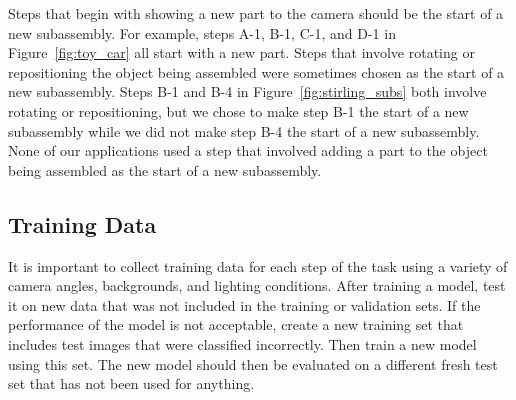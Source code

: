 Steps that begin with showing a new part to the camera should be the start of a
new subassembly. For example, steps A-1, B-1, C-1, and D-1 in
Figure~\ref{fig:toy_car} all start with a new part.
Steps that involve rotating or repositioning the object being assembled were
sometimes chosen as the start of a new subassembly.
Steps B-1 and B-4 in Figure~\ref{fig:stirling_subs} both involve rotating or
repositioning, but we chose to make step B-1 the start of a new subassembly
while we did not make step B-4 the start of a new subassembly.
None of our applications used a step that involved adding a part to the object
being assembled as the start of a new subassembly.

\subsection{Training Data}

It is important to collect training data for each step of the task using a
variety of camera angles, backgrounds, and lighting conditions.
After training a model, test it on new data that was not included in the
training or validation sets.
If the performance of the model is not acceptable, create a new training
set that includes test images that were classified incorrectly.
Then train a new model using this set.
The new model should then be evaluated on a different fresh test set that has
not been used for anything.
